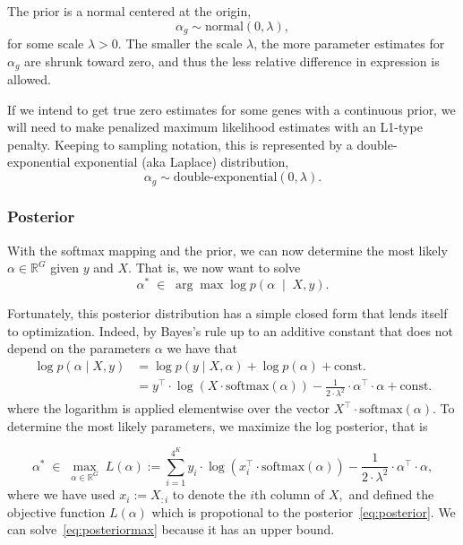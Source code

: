 \documentclass[11pt]{article}
\begin{document}
The prior is a normal centered at the origin,
\[
  \alpha_g \sim \textrm{normal}(0, \lambda),
\]
for some scale $\lambda > 0$.  The smaller the scale $\lambda$, the
more parameter estimates for $\alpha_g$ are shrunk toward zero, and
thus the less relative difference in expression is allowed.

If we intend to get true zero estimates for some genes with a
continuous prior, we will need to make penalized maximum likelihood
estimates with an L1-type penalty.  Keeping to sampling notation, this
is represented by a double-exponential exponential (aka Laplace)
distribution,
\[
  \alpha_g \sim \textrm{double-exponential}(0, \lambda).
\]


\subsubsection{Posterior}

With the softmax mapping and the prior, we can now determine the most likely 
$\alpha \in \mathbb{R}^{G}$ given $y$ and $X$. That is, we now want to solve
\begin{equation}
\alpha^* \; \in \; \arg \max \log p(\alpha \; \mid \; X,y).
\end{equation}

Fortunately, this posterior distribution has a simple closed form that lends itself to optimization.
 Indeed, by Bayes's rule up to an additive constant
that does not depend on the parameters $\alpha$ we have that
\begin{align}\nonumber
  \log p(\alpha \mid X, y)& = \log p(y \mid X, \alpha) + \log p(\alpha) +
  \textrm{const.}  \\
  &= y^{\top} \cdot \log \left( X \cdot \textrm{softmax}(\alpha) \right)
          - \frac{1}{2 \cdot \lambda^2} \cdot \alpha^{\top} \cdot \alpha +\textrm{const.}  \label{eq:posterior} 
\end{align} 
 where the logarithm is applied elementwise over the vector $ X^{\top} \cdot \textrm{softmax}(\alpha).$ To determine the most likely parameters, we maximize the log posterior, that is
 
 \begin{equation} \label{eq:posteriormax} 
 \alpha^* \; \in \; \max_{\alpha \in \mathbb{R}^G} \; L(\alpha) :=  \sum_{i=1}^{4^K} y_i \cdot \log \left( x_i^\top \cdot \textrm{softmax}(\alpha) \right)
          - \frac{1}{2 \cdot \lambda^2} \cdot \alpha^{\top} \cdot \alpha,
 \end{equation}
where we have used $x_i := X_{:i}$ to denote the $i$th column of $X,$ and defined the objective function $L(\alpha)$ which is propotional to the posterior~\eqref{eq:posterior}.
We can solve~\eqref{eq:posteriormax} because it has an upper bound. 
\end{document}
